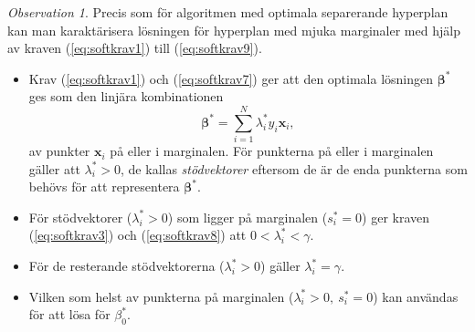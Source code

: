 \documentclass[a4paper, 12pt]{report}
\theoremstyle{definition}
\theoremstyle{remark}
\newtheorem*{rem}{Observation}
\newcommand{\bfbeta}{{\boldsymbol{\beta}}}
\begin{document}
\begin{rem}
	Precis som för algoritmen med optimala separerande hyperplan kan man karaktärisera lösningen för hyperplan med mjuka marginaler med hjälp av kraven (\ref{eq:softkrav1}) till (\ref{eq:softkrav9}).
	\begin{itemize}
		\item Krav (\ref{eq:softkrav1}) och (\ref{eq:softkrav7}) ger att den optimala lösningen $\bfbeta^*$ ges som den linjära kombinationen
		\begin{equation*}
			\bfbeta^* = \sum_{i=1}^{N}\lambda_i^*y_i\mathbf{x}_i,
		\end{equation*}
		av punkter $\mathbf{x}_i$ på eller i marginalen. För punkterna på eller i marginalen gäller att $\lambda^*_i>0$, de kallas \emph{stödvektorer} eftersom de är de enda punkterna som behövs för att representera $\bfbeta^*$.
		\item För stödvektorer ($\lambda^*_i>0$) som ligger på marginalen ($s_i^*=0$) ger kraven (\ref{eq:softkrav3}) och (\ref{eq:softkrav8}) att $0<\lambda_i^*<\gamma$.
		\item För de resterande stödvektorerna ($\lambda_i^*>0$) gäller $\lambda_i^*=\gamma$.
		\item Vilken som helst av punkterna på marginalen ($\lambda^*_i>0,~s^*_i=0$) kan användas för att lösa för $\beta_0^*$.
	\end{itemize}
\end{rem}
\FloatBarrier
\end{document}
